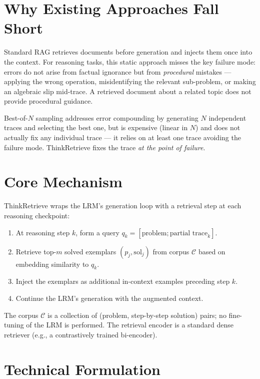 \documentclass[10pt,twocolumn]{article}
\begin{document}
\section{Why Existing Approaches Fall Short}

Standard RAG retrieves documents before generation and injects them once into the
context. For reasoning tasks, this static approach misses the key failure mode:
errors do not arise from factual ignorance but from \emph{procedural} mistakes —
applying the wrong operation, misidentifying the relevant sub-problem, or making
an algebraic slip mid-trace. A retrieved document about a related topic does not
provide procedural guidance.

Best-of-$N$ sampling addresses error compounding by generating $N$ independent traces
and selecting the best one, but is expensive (linear in $N$) and does not actually
fix any individual trace — it relies on at least one trace avoiding the failure mode.
ThinkRetrieve fixes the trace \emph{at the point of failure}.

\section{Core Mechanism}

ThinkRetrieve wraps the LRM's generation loop with a retrieval step at each
reasoning checkpoint:

\begin{enumerate}[itemsep=2pt,parsep=0pt]
  \item At reasoning step $k$, form a query $q_k = [\text{problem}; \text{partial trace}_k]$.
  \item Retrieve top-$m$ solved exemplars $(p_j, \mathrm{sol}_j)$ from corpus $\mathcal{C}$
    based on embedding similarity to $q_k$.
  \item Inject the exemplars as additional in-context examples preceding step $k$.
  \item Continue the LRM's generation with the augmented context.
\end{enumerate}

The corpus $\mathcal{C}$ is a collection of (problem, step-by-step solution) pairs;
no fine-tuning of the LRM is performed. The retrieval encoder is a standard
dense retriever (e.g., a contrastively trained bi-encoder).

\section{Technical Formulation}
\end{document}

